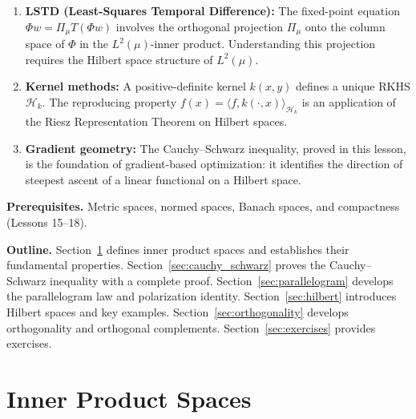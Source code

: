 \documentclass[11pt,a4paper]{article}
\begin{document}
\begin{rlconnection}[title={Why Inner Products Matter for RL/ML}]
\begin{enumerate}[leftmargin=2em,nosep]
    \item \textbf{LSTD (Least-Squares Temporal Difference):} The fixed-point
          equation $\Phi w = \Pi_\mu T(\Phi w)$ involves the orthogonal
          projection $\Pi_\mu$ onto the column space of $\Phi$ in the
          $L^2(\mu)$-inner product. Understanding this projection requires
          the Hilbert space structure of $L^2(\mu)$.
    \item \textbf{Kernel methods:} A positive-definite kernel $k(x,y)$
          defines a unique RKHS $\mathcal{H}_k$. The reproducing property
          $f(x) = \langle f, k(\cdot, x) \rangle_{\mathcal{H}_k}$ is an
          application of the Riesz Representation Theorem on Hilbert spaces.
    \item \textbf{Gradient geometry:} The Cauchy--Schwarz inequality, proved
          in this lesson, is the foundation of gradient-based optimization:
          it identifies the direction of steepest ascent of a linear
          functional on a Hilbert space.
\end{enumerate}
\end{rlconnection}

\medskip
\noindent\textbf{Prerequisites.} Metric spaces, normed spaces, Banach
spaces, and compactness (Lessons 15--18).

\medskip
\noindent\textbf{Outline.}
Section~\ref{sec:inner_product} defines inner product spaces and establishes
their fundamental properties.
Section~\ref{sec:cauchy_schwarz} proves the Cauchy--Schwarz inequality with
a complete proof.
Section~\ref{sec:parallelogram} develops the parallelogram law and
polarization identity.
Section~\ref{sec:hilbert} introduces Hilbert spaces and key examples.
Section~\ref{sec:orthogonality} develops orthogonality and orthogonal
complements.
Section~\ref{sec:exercises} provides exercises.


\section{Inner Product Spaces}
\label{sec:inner_product}
\end{document}
